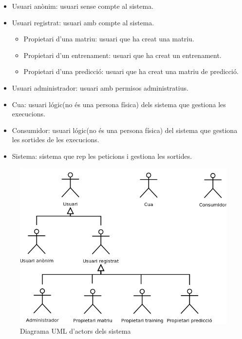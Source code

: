 \begin{itemize}
\item Usuari an\`{o}nim: usuari sense compte al sistema.
\item Usuari registrat: usuari amb compte al sistema.
\begin{itemize}
\item Propietari d'una matriu: usuari que ha creat una matriu.
\item Propietari d'un entrenament: usuari que ha creat un entrenament.
\item Propietari d'una predicci\'{o}: usuari que ha creat una matriu de predicci\'{o}.
\end{itemize}
\item Usuari administrador: usuari amb permisos administratius.
\item Cua: usuari l\'{o}gic(no \'{e}s una persona f\'{i}sica) dels sistema que gestiona les execucions.
\item Consumidor: usuari l\'{o}gic(no \'{e}s una persona f\'{i}sica) del sistema que gestiona les sortides de les execucions.
\item Sistema: sistema que rep les peticions i gestiona les sortides.
\end{itemize}

\begin{figure}[h]
  \centering
  \includegraphics[scale=0.4]{img/specification/Actors.png}
  \caption{Diagrama UML d'actors dels sistema}
  \label{fig:actors}
\end{figure}

